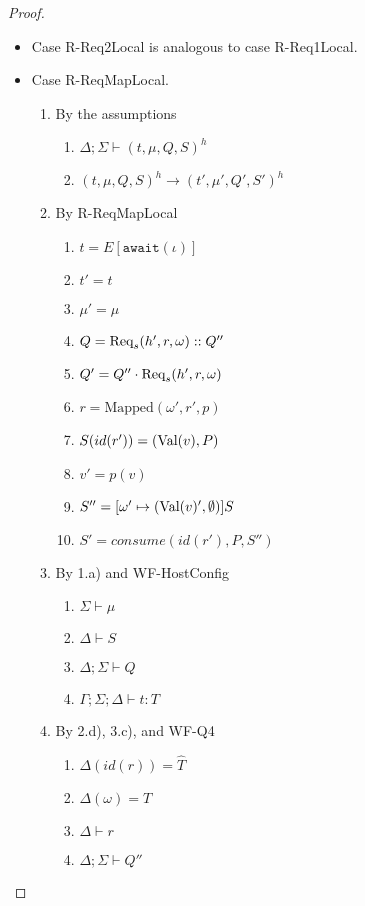 \begin{proof}
\begin{itemize}
\item Case R-Req2Local is analogous to case R-Req1Local.

\item Case R-ReqMapLocal.
\begin{enumerate}
\item By the assumptions
  \begin{enumerate}[label=(\alph*)]
  \item $\Delta ; \Sigma \vdash (t, \mu, Q, S)^h$
  \item $(t, \mu, Q, S)^h \longrightarrow (t', \mu', Q', S')^h$
  \end{enumerate}
\item By R-ReqMapLocal
  \begin{enumerate}[label=(\alph*)]
  \item $t = E[\texttt{await}(\iota)]$
  \item $t' = t$
  \item $\mu' = \mu$
  \item $Q = {\textrm{Req}_s(h', r, \omega)} :: Q''$
  \item $Q' = Q'' \cdot {\textrm{Req}_s(h', r, \omega)}$
  \item $r = \text{Mapped}(\omega', r', p)$
  \item $S(id(r')) = ({\textrm{Val}(v)}, P)$
  \item $v' = p(v)$  %
  \item $S'' = [\omega' \mapsto ({\textrm{Val}(v)'}, \emptyset)]S$
  \item $S' = consume(id(r'), P, S'')$  %
  \end{enumerate}
\item By 1.a) and WF-HostConfig
  \begin{enumerate}[label=(\alph*)]
  \item $\Sigma \vdash \mu$
  \item $\Delta \vdash S$
  \item $\Delta ; \Sigma \vdash Q$
  \item $\Gamma ; \Sigma ; \Delta \vdash t : T$
  \end{enumerate}
\item By 2.d), 3.c), and WF-Q4
  \begin{enumerate}[label=(\alph*)]
  \item $\Delta(id(r)) = \hat{T}$
  \item $\Delta(\omega) = \hat{T}$
  \item $\Delta \vdash r$
  \item $\Delta ; \Sigma \vdash Q''$
  \end{enumerate}

\end{enumerate}
\end{itemize}
\end{proof}
